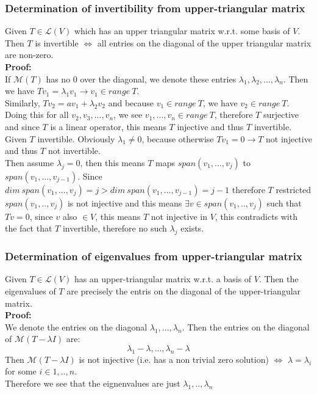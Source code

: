 \documentclass{article}
\begin{document}
\subsubsection{Determination of invertibility from upper-triangular matrix}
Given $T \in \mathcal{L}(V)$ which has an upper triangular matrix w.r.t. some basis of $V$. Then $T$ is invertible $\iff$ all entries on the diagonal of the upper triangular matrix are non-zero.\\
\textbf{Proof:}\\
If $\mathcal{M}(T)$ has no $0$ over the diagonal, we denote these entries $\lambda_1, \lambda_2, ..., \lambda_n$. Then we have $Tv_1 = \lambda_1v_1 \rightarrow v_1 \in range\ T$.\\
Similarly, $Tv_2 = av_1 + \lambda_2v_2$ and because $v_1 \in range\ T$, we have $v_2 \in range\ T$. Doing this for all $v_2, v_3, ..., v_n$, we see $v_1, ..., v_n \in range\ T$, therefore $T$ surjective and since $T$ is a linear operator, this means $T$ injective and thus $T$ invertible.\\
Given $T$ invertible. Obviously $\lambda_1 \neq 0$, because otherwise $Tv_1 = 0 \rightarrow T$ not injective and thus $T$ not invertible.\\
Then assume $\lambda_j = 0$, then this means $T$ maps $span(v_1, ..., v_j)$ to $span(v_1, ..., v_{j-1})$. Since $dim\ span(v_1, ..., v_j) = j > dim\ span(v_1, ..., v_{j-1}) = j-1$ therefore $T$ restricted $span(v_1, .., v_j)$ is not injective and this means $\exists v \in span(v_1, .., v_j)$ such that $Tv = 0$, since $v$ also $\in V$, this means $T$ not injective in $V$, this contradicts with the fact that $T$ invertible, therefore no such $\lambda_j$ exists.
\subsubsection{Determination of eigenvalues from upper-triangular matrix}
Given $T \in \mathcal{L}(V)$ has an upper-triangular matrix w.r.t. a basis of $V$. Then the eigenvalues of $T$ are precisely the entris on the diagonal of the upper-triangular matrix.\\
\textbf{Proof:}\\
We denote the entries on the diagonal $\lambda_1, ..., \lambda_n$. Then the entries on the diagonal of $\mathcal{M}(T-\lambda I)$ are:
\begin{equation*}
    \lambda_1 - \lambda, ..., \lambda_n - \lambda
\end{equation*}
Then $\mathcal{M}(T - \lambda I)$ is not injective (i.e. has a non trivial zero solution) $\iff$ $\lambda = \lambda_i$ for some $i \in 1, .., n$.\\
Therefore we see that the eignenvalues are just $\lambda_1, .., \lambda_n$
\end{document}
